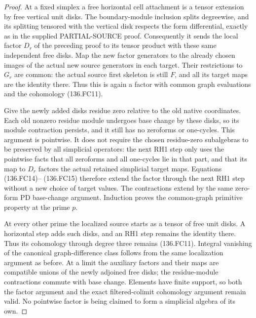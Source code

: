 \begin{proof}
At a fixed simplex a free horizontal cell attachment is a tensor
extension by free vertical unit disks. The boundary-module inclusion
splits degreewise, and its splitting tensored with the vertical
disk respects the form differential, exactly as in the supplied
PARTIAL-SOURCE proof. Consequently it sends the local factor
\(D_r\) of the preceding proof to its tensor product with
these same independent free disks. Map the new factor generators
to the already chosen images of the actual new source generators
in each target. Their restrictions to \(G_r\) are common:
the actual source first skeleton is still \(F\), and all its
target maps are the identity there. Thus this is again a factor
with common graph evaluations and the cohomology (136.FC11).

Give the newly added disks residue zero relative to the old
native coordinates. Each old nonzero residue module undergoes
base change by these disks, so its module contraction persists,
and it still has no zeroforms or one-cycles. This argument is
pointwise. It does not require the chosen residue-zero subalgebras
to be preserved by all simplicial operators: the next RH1 step
only uses the pointwise facts that all zeroforms and all one-cycles
lie in that part, and that its map to \(D_r\) factors the
actual retained simplicial target maps. Equations (136.FC14)--
(136.FC15) therefore extend the factor through the next RH1 step
without a new choice of target values. The contractions extend
by the same zero-form PD base-change argument. Induction proves
the common-graph primitive property at the prime \(p\).

At every other prime the localized source starts as a tensor
of free unit disks. A horizontal step adds such disks, and an
RH1 step remains the identity there. Thus its cohomology through
degree three remains (136.FC11). Integral vanishing of the
canonical graph-difference class follows from the same localization
argument as before. At a limit the auxiliary factors and their
maps are compatible unions of the newly adjoined free disks;
the residue-module contractions commute with base change. Elements
have finite support, so both the factor argument and the exact
filtered-colimit cohomology argument remain valid. No pointwise
factor is being claimed to form a simplicial algebra of its own.


\end{proof}
